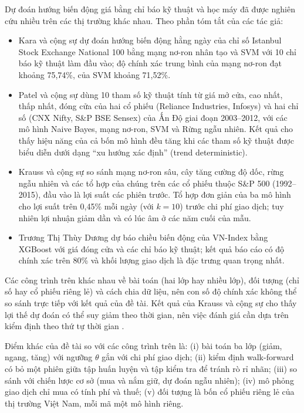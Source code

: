 \documentclass[12pt,a4paper,oneside]{report}
\begin{document}
Dự đoán hướng biến động giá bằng chỉ báo kỹ thuật và học máy đã được nghiên
cứu nhiều trên các thị trường khác nhau. Theo phần tóm tắt của các tác giả:
\begin{itemize}
  \item Kara và cộng sự \cite{kara2011} dự đoán hướng biến động hằng ngày của
        chỉ số Istanbul Stock Exchange National 100 bằng mạng nơ-ron nhân tạo
        và SVM với 10 chỉ báo kỹ thuật làm đầu vào; độ chính xác trung bình
        của mạng nơ-ron đạt khoảng 75,74\%, của SVM khoảng 71,52\%.
  \item Patel và cộng sự \cite{patel2015} dùng 10 tham số kỹ thuật tính từ giá
        mở cửa, cao nhất, thấp nhất, đóng cửa của hai cổ phiếu (Reliance
        Industries, Infosys) và hai chỉ số (CNX Nifty, S\&P BSE Sensex) của Ấn
        Độ giai đoạn 2003--2012, với các mô hình Naive Bayes, mạng nơ-ron, SVM
        và Rừng ngẫu nhiên. Kết quả cho thấy hiệu năng của cả bốn mô hình đều
        tăng khi các tham số kỹ thuật được biểu diễn dưới dạng ``xu hướng xác
        định'' (trend deterministic).
  \item Krauss và cộng sự \cite{krauss2017} so sánh mạng nơ-ron sâu, cây tăng
        cường độ dốc, rừng ngẫu nhiên và các tổ hợp của chúng trên các cổ phiếu
        thuộc S\&P 500 (1992--2015), đầu vào là lợi suất các phiên trước. Tổ hợp
        đơn giản của ba mô hình cho lợi suất trên 0,45\% mỗi ngày (với $k=10$)
        trước chi phí giao dịch; tuy nhiên lợi nhuận giảm dần và có lúc âm ở
        các năm cuối của mẫu.
  \item Trương Thị Thùy Dương \cite{duong2023} dự báo chiều biến động của
        VN-Index bằng XGBoost với giá đóng cửa và các chỉ báo kỹ thuật; kết quả
        báo cáo có độ chính xác trên 80\% và khối lượng giao dịch là đặc trưng
        quan trọng nhất.
\end{itemize}

Các công trình trên khác nhau về bài toán (hai lớp hay nhiều lớp), đối tượng
(chỉ số hay cổ phiếu riêng lẻ) và cách chia dữ liệu, nên con số độ chính xác
không thể so sánh trực tiếp với kết quả của đề tài. Kết quả của Krauss và cộng
sự cho thấy lợi thế dự đoán có thể suy giảm theo thời gian, nên việc đánh giá
cần dựa trên kiểm định theo thứ tự thời gian \cite{bergmeir2012,lopezdeprado2018}.

Điểm khác của đề tài so với các công trình trên là: (i) bài toán ba lớp
(giảm, ngang, tăng) với ngưỡng $\theta$ gắn với chi phí giao dịch; (ii) kiểm
định walk-forward có bỏ một phiên giữa tập huấn luyện và tập kiểm tra để tránh
rò rỉ nhãn; (iii) so sánh với chiến lược cơ sở (mua và nắm giữ, dự đoán ngẫu
nhiên); (iv) mô phỏng giao dịch chỉ mua có tính phí và thuế; (v) đối tượng là
bốn cổ phiếu riêng lẻ của thị trường Việt Nam, mỗi mã một mô hình riêng.
\end{document}
